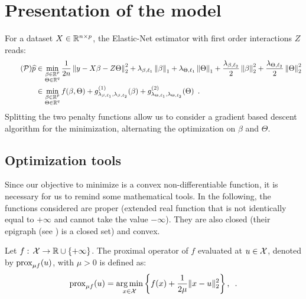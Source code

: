 \documentclass[../main.tex]{subfiles}
\begin{document}

\section{Presentation of the model}

For a dataset $X\in\mathbb{R}^{n\times p}$, the Elastic-Net estimator with first order
interactions $Z$ reads:
\begin{align} \label{pb:init} \tag{$\cP$}
	\widehat{p}
	& \in \min_{\substack{\beta \in \bbR^p \\ \Theta \in \bbR^q}}
		\frac{1}{2 n} \norm{y - X\beta - Z\Theta}^2_2 +
		\lambda_{\beta, \ell_1} \norm{\beta}_1 +
		\lambda_{\Theta, \ell_1}\norm{\Theta}_1 +
		\frac{\lambda_{\beta, \ell_2}}{2} \norm{\beta}_2^2 +
		\frac{\lambda_{\Theta, \ell_2}}{2} \norm{\Theta}_2^2 \\
	 & \in \min_{\substack{\beta \in \bbR^p \\ \Theta \in \bbR^q}}
		f(\beta, \Theta) +
		g^{(1)}_{\lambda_{\beta, \ell_1}, \lambda_{\beta, \ell_2}}(\beta) +
		g^{(2)}_{\lambda_{\Theta, \ell_1}, \lambda_{\Theta, \ell_2}}(\Theta)
		\enspace. \nonumber
\end{align}
Splitting the two penalty functions allow us to consider a gradient based
descent algorithm for the minimization, alternating the optimization on $\beta$
and $\Theta$.

\subsection{Optimization tools}

Since our objective to minimize is a convex non-differentiable function,
it is necessary for us to remind some mathematical tools.
In the following, the functions considered are proper (extended real function
that is not identically equal to $+\infty$ and cannot take the value $-\infty$).
They are also closed (their epigraph (see ) is a closed set)
and convex.

\begin{definition}
	Let $f:\,\mathcal{X}\rightarrow \mathbb{R} \cup \{+\infty\}$. The proximal operator of $f$
	evaluated at $u\in \mathcal{X}$, denoted by $\operatorname{prox}_{\mu f}(u)$, with
	$\mu>0$ is defined as:
\begin{align}\label{def:prox}
	\operatorname{prox}_{\mu f}(u) =
	\mathop{\mathrm{arg\,min}}_{x\in\mathcal{X}} \left\{ f(x) + \frac{1}{2\mu} \|x-u\|^2_2 \right\},
	\enspace.
\end{align}
\end{definition}
\end{document}
